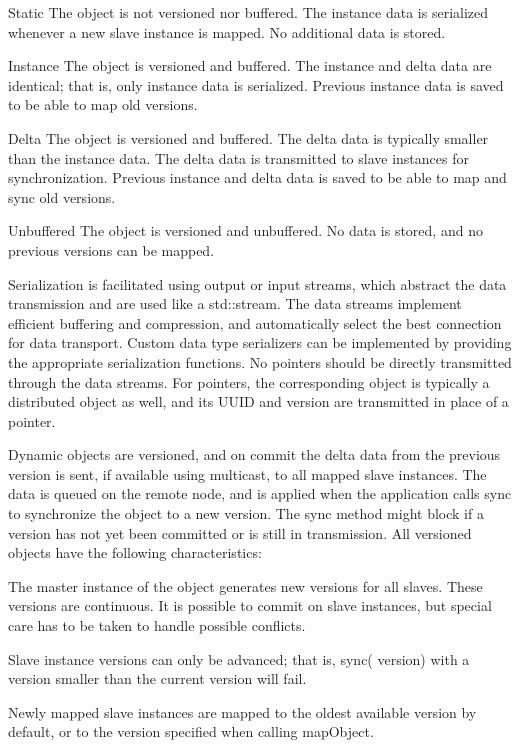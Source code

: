 \begin{compactdesc}
\item[Static] The object is not versioned nor buffered. The instance data is
  serialized whenever a new slave instance is mapped. No additional data is
  stored.
\item[Instance] The object is versioned and buffered. The instance and delta
  data are identical; that is, only instance data is serialized. Previous
  instance data is saved to be able to map old versions.
\item[Delta] The object is versioned and buffered. The delta data is typically
  smaller than the instance data. The delta data is transmitted to slave
  instances for synchronization. Previous instance and delta data is saved to be
  able to map and sync old versions.
\item[Unbuffered] The object is versioned and unbuffered. No data is stored, and
  no previous versions can be mapped.
\end{compactdesc}

Serialization is facilitated using output or input streams, which abstract the
data transmission and are used like a \textsf{std::stream}. The data streams
implement efficient buffering and compression, and automatically select the best
connection for data transport. Custom data type serializers can be implemented
by providing the appropriate serialization functions. No pointers should be
directly transmitted through the data streams. For pointers, the corresponding
object is typically a distributed object as well, and its UUID and version are
transmitted in place of a pointer.

Dynamic objects are versioned, and on \textsf{commit} the delta data from the
previous version is sent, if available using multicast, to all mapped slave
instances. The data is queued on the remote node, and is applied when the
application calls \textsf{sync} to synchronize the object to a new version. The
\textsf{sync} method might block if a version has not yet been committed or is
still in transmission. All versioned objects have the following characteristics:

\begin{compactitem}
\item The master instance of the object generates new versions for all
  slaves. These versions are continuous. It is possible to commit on slave
  instances, but special care has to be taken to handle possible
  conflicts.
\item Slave instance versions can only be advanced; that is, \textsf{sync(
  version)} with a version smaller than the current version will fail.
\item Newly mapped slave instances are mapped to the oldest available
  version by default, or to the version specified when calling
  \textsf{mapObject}.
\end{compactitem}

